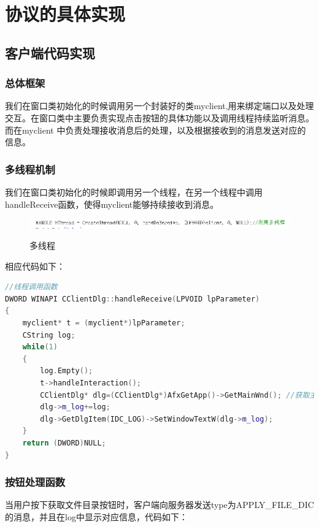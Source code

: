 \section{协议的具体实现}
\subsection{客户端代码实现}

\subsubsection{总体框架}
我们在窗口类初始化的时候调用另一个封装好的类myclient,用来绑定端口以及处理交互。在窗口类中主要负责实现点击按钮的具体功能以及调用线程持续监听消息。而在myclient 中负责处理接收消息后的处理，以及根据接收到的消息发送对应的信息。
\subsubsection{多线程机制}
我们在窗口类初始化的时候即调用另一个线程，在另一个线程中调用handleReceive函数，使得myclient能够持续接收到消息。

\begin{figure}[H]
  \centering
  \includegraphics[width=0.8\linewidth]{figure/multiposix}\\
  \caption{多线程}
\end{figure}

相应代码如下：

\begin{flushleft}
\begin{lstlisting}[language={C++},basicstyle=\footnotesize]
//线程调用函数
DWORD WINAPI CClientDlg::handleReceive(LPVOID lpParameter)
{
	myclient* t = (myclient*)lpParameter;
	CString log;
	while(1)
	{
		log.Empty();
		t->handleInteraction();
		CClientDlg* dlg=(CClientDlg*)AfxGetApp()->GetMainWnd(); //获取主窗口
		dlg->m_log+=log;
		dlg->GetDlgItem(IDC_LOG)->SetWindowTextW(dlg->m_log);
	}
	return (DWORD)NULL;
}
\end{lstlisting}
\end{flushleft}

\subsubsection{按钮处理函数}
当用户按下获取文件目录按钮时，客户端向服务器发送type为APPLY\_FILE\_DIC的消息，并且在log中显示对应信息，代码如下：



